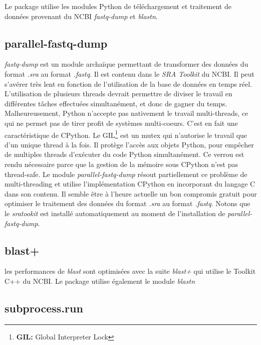 \documentclass[twoside,a4paper,11pt,frenchb,openany]{report}
\begin{document}
Le package utilise les modules Python de téléchargement et traitement de données provenant du NCBI \textit{fastq-dump} et \textit{blastn}. 



\subsection{parallel-fastq-dump}

\textit{fastq-dump} est un module archaïque permettant de transformer des données du format \textit{.sra} au format \textit{.fastq}. Il est contenu dans le \textit{SRA Toolkit} du NCBI. Il peut s'avérer très lent en fonction de l'utilisation de la base de données en temps réel. L'utilisation de plusieurs threads devrait permettre de diviser le travail en différentes tâches effectuées simultanément, et donc de gagner du temps. Malheureusement, Python n'accepte pas nativement le travail multi-threads, ce qui ne permet pas de tirer profit de systèmes multi-coeurs. C'est en fait une caractéristique de CPython. Le GIL\footnote{\textbf{GIL:} Global Interpreter Lock} est un mutex qui n'autorise le travail que d'un unique thread à la fois. Il protège l'accès aux objets Python, pour empêcher de multiples threads d'exécuter du code Python simultanément. Ce verrou est rendu nécessaire parce que la gestion de la mémoire sous CPython n'est pas thread-safe. Le module \textit{parallel-fastq-dump} résout partiellement ce problème de multi-threading et utilise l'implémentation CPython en incorporant du langage C dans son contenu. Il semble être à l'heure actuelle un bon compromis gratuit pour optimiser le traitement des données du format \textit{.sra} au format \textit{.fastq}. Notons que le \textit{sratookit} est installé automatiquement au moment de l'installation de \textit{parallel-fastq-dump}.


\subsection{blast+}

les performances de \textit{blast} sont optimisées avec la suite \textit{blast+} qui utilise le Toolkit C++ du NCBI. Le package utilise également le module \textit{blastn} 


\subsection{subprocess.run}
\end{document}
